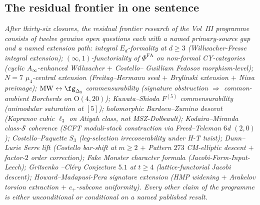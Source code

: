 \subsection{The residual frontier in one sentence}
\label{wn:subsec:wave3-one-line}

\emph{After thirty-six closures, the residual frontier research of the
Vol~III programme consists of twelve genuine open questions each with
a named primary-source gap and a named extension path: integral
$E_d$-formality at $d \geq 3$ (Willwacher-Fresse integral extension);
$(\infty,1)$-functoriality of $\Phi^{\mathrm{FA}}$ on non-formal
CY-categories (cyclic $A_\infty$-enhanced Willwacher $+$ Costello--
Gwilliam Fedosov morphism-level); $N = 7$ $\mu_4$-central extension
(Freitag--Hermann seed $+$ Brylinski extension $+$ Niwa preimage);
$\mathrm{MW} \leftrightarrow \fg_{\Delta_5}$ commensurability
(signature obstruction $\Rightarrow$ common-ambient Borcherds on
$\mathrm{O}(4, 20)$); Kuwata--Shioda $F^{(5)}$ commensurability
(unimodular saturation at $[5]$); holomorphic Bardeen--Zumino descent
(Kapranov cubic $\ell_3$ on Atiyah class, not MSZ-Dolbeault);
Kodaira--Miranda class-$\mathcal{S}$ coherence (SCFT moduli-stack
construction via Freed--Teleman $6$d $(2,0)$); Costello--Paquette
$S_3$ (leg-selection irrecoverability under H-T twist);
Dunn--Lurie Serre lift (Costello bar-shift at $m \geq 2$ $+$
Pattern $273$ CM-elliptic descent $+$ factor-$2$ order correction);
Fake Monster character formula (Jacobi-Form-Input-Leech); Gritsenko
--Cl\'ery Conjecture $5.1$ at $t \geq 4$ (lattice-functorial Jacobi
descent); Howard--Madapusi-Pera signature extension (HMP widening
$+$ Arakelov torsion extraction $+$ $c_+$-subcone uniformity). Every
other claim of the programme is either unconditional or conditional
on a named published result.}

